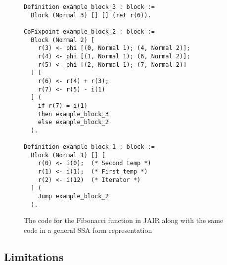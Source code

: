 \begin{figure}[ht]
\centering
\begin{minipage}{0.65\textwidth}
\begin{lstlisting}[style=Coq]
Definition example_block_3 : block :=
  Block (Normal 3) [] [] (ret r(6)).

CoFixpoint example_block_2 : block :=
  Block (Normal 2) [
    r(3) <- phi [(0, Normal 1); (4, Normal 2)];
    r(4) <- phi [(1, Normal 1); (6, Normal 2)];
    r(5) <- phi [(2, Normal 1); (7, Normal 2)]
  ] [
    r(6) <- r(4) + r(3);
    r(7) <- r(5) - i(1)
  ] (
    if r(7) = i(1)
    then example_block_3
    else example_block_2
  ).

Definition example_block_1 : block :=
  Block (Normal 1) [] [
    r(0) <- i(0);  (* Second temp *)
    r(1) <- i(1);  (* First temp *)
    r(2) <- i(12)  (* Iterator *)
  ] (
    Jump example_block_2
  ).
\end{lstlisting}
\end{minipage}
\hfill
\begin{minipage}{0.30\textwidth}
\centering
{}
\end{minipage}
\caption{The code for the Fibonacci function in JAIR along with the same code in a general SSA form representation}
\label{fig:example-jair}
\end{figure}

\subsection{Limitations}
\label{subsec:limitations}

